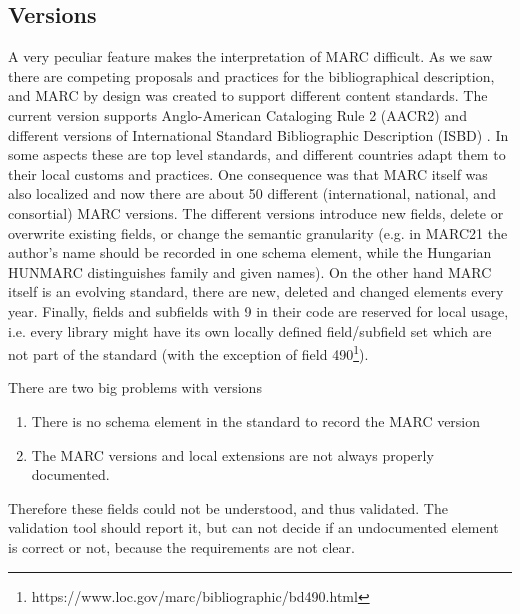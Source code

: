 \subsection{Versions}

A very peculiar feature makes the interpretation of MARC difficult. As we saw there are competing proposals and practices for the bibliographical description, and MARC by design was created to support different content standards. The current version supports Anglo-American Cataloging Rule 2 (AACR2) \cite{aacr2} and different versions of International Standard Bibliographic Description (ISBD) \cite{isbd}. In some aspects these are top level standards, and different countries adapt them to their local customs and practices. One consequence was that MARC itself was also localized and now there are about 50 different (international, national, and consortial) MARC versions. The different versions introduce new fields, delete or overwrite existing fields, or change the semantic granularity (e.g. in MARC21 the author's name should be recorded in one schema element, while the Hungarian HUNMARC distinguishes family and given names). On the other hand MARC itself is an evolving standard, there are new, deleted and changed elements every year. Finally, fields and subfields with 9 in their code are reserved for local usage, i.e. every library might have its own locally defined field/subfield set which are not part of the standard (with the exception of field 490\footnote{https://www.loc.gov/marc/bibliographic/bd490.html}).

There are two big problems with versions

\begin{enumerate}
  \item There is no schema element in the standard to record the MARC version
  \item The MARC versions and local extensions are not always properly documented.
\end{enumerate}

Therefore these fields could not be understood, and thus validated. The validation tool should report it, but can not decide if an undocumented element is correct or not, because the requirements are not clear.

